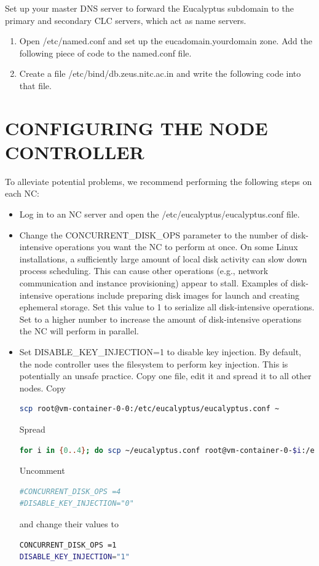 Set up your master DNS server to forward the Eucalyptus subdomain to the primary and secondary CLC servers, which act as name servers.

\begin{enumerate}
\item Open /etc/named.conf and set up the eucadomain.yourdomain zone. 
Add the following piece of code to the named.conf file.


\item Create a file /etc/bind/db.zeus.nitc.ac.in and write the following code into that file.

\end{enumerate}

\section{CONFIGURING THE NODE CONTROLLER}
To alleviate potential problems, we recommend performing the following steps on each NC:
\begin{itemize}
\item Log in to an NC server and open the /etc/eucalyptus/eucalyptus.conf file.
\item Change the CONCURRENT\_DISK\_OPS parameter to the number of disk-intensive operations you want the NC to perform at once. On some Linux installations, a sufficiently large amount of local disk activity can slow down process scheduling. This can cause other operations (e.g., network communication and instance provisioning) appear to stall. Examples of disk-intensive operations include preparing disk images for launch and creating ephemeral storage. Set this value to 1 to serialize all disk-intensive operations. Set to a higher number to increase the amount of disk-intensive operations the NC will perform in parallel.
\item Set DISABLE\_KEY\_INJECTION=1 to disable key injection. By default, the node controller uses the filesystem to perform key injection. This is potentially an unsafe practice.
Copy one file, edit it and spread it to all other nodes.
Copy
\begin{lstlisting}[language=bash]
scp root@vm-container-0-0:/etc/eucalyptus/eucalyptus.conf ~
\end{lstlisting}
Spread
\begin{lstlisting}[language=bash]
for i in {0..4}; do scp ~/eucalyptus.conf root@vm-container-0-$i:/etc/eucalyptus/eucalyptus.conf ; done
\end{lstlisting}
Uncomment 
\begin{lstlisting}[language=bash]
#CONCURRENT_DISK_OPS =4
#DISABLE_KEY_INJECTION="0"
\end{lstlisting}
 and change their values to 
 \begin{lstlisting}[language=bash]
CONCURRENT_DISK_OPS =1
DISABLE_KEY_INJECTION="1"
\end{lstlisting}
\end{itemize}
